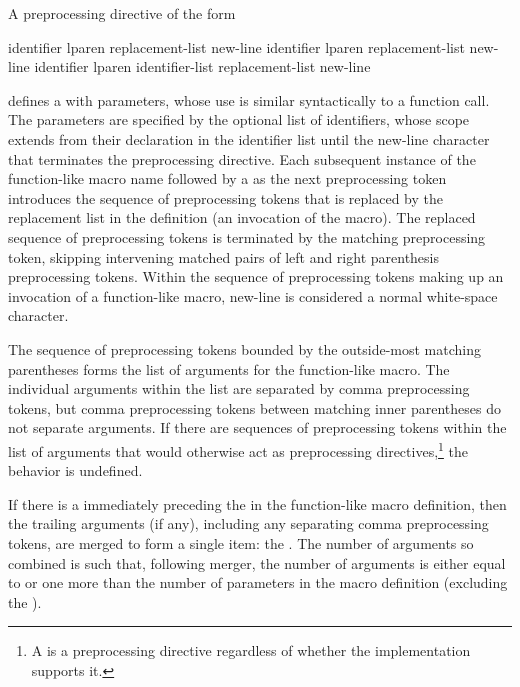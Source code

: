 \pnum
A preprocessing directive of the form
\begin{ncsimplebnf}
 identifier lparen  \terminal{)} replacement-list new-line\br
{} identifier lparen  \terminal{)} replacement-list new-line\br
{} identifier lparen identifier-list  \terminal{)} replacement-list new-line
\end{ncsimplebnf}
defines a 
with parameters, whose use is
similar syntactically to a function call.
The parameters
%
are specified by the optional list of identifiers,
whose scope extends from their declaration in the identifier list
until the new-line character that terminates the
preprocessing directive.
Each subsequent instance of the function-like macro name followed by a
\tcode{(}
as the next preprocessing token
introduces the sequence of preprocessing tokens that is replaced
by the replacement list in the definition
(an invocation of the macro).
%
The replaced sequence of preprocessing tokens is terminated by the matching
\tcode{)}
preprocessing token, skipping intervening matched pairs of left and
right parenthesis preprocessing tokens.
Within the sequence of preprocessing tokens making up an invocation
of a function-like macro,
new-line is considered a normal white-space character.

\pnum
{}%
The sequence of preprocessing tokens
bounded by the outside-most matching parentheses
forms the list of arguments for the function-like macro.
The individual arguments within the list
are separated by comma preprocessing tokens,
but comma preprocessing tokens between matching
inner parentheses do not separate arguments.
If there are sequences of preprocessing tokens within the list of
arguments that would otherwise act as preprocessing directives,\footnote{A  is a preprocessing directive regardless of whether the implementation supports it.}
the behavior is undefined.

\pnum
{}%
If there is a  immediately preceding the \tcode{)} in the
function-like macro
definition, then the trailing arguments (if any), including any separating comma preprocessing
tokens, are merged to form a single item: the . The number of
arguments so combined is such that, following merger, the number of arguments is
either equal to or
one more than the number of parameters in the macro definition (excluding the
).

